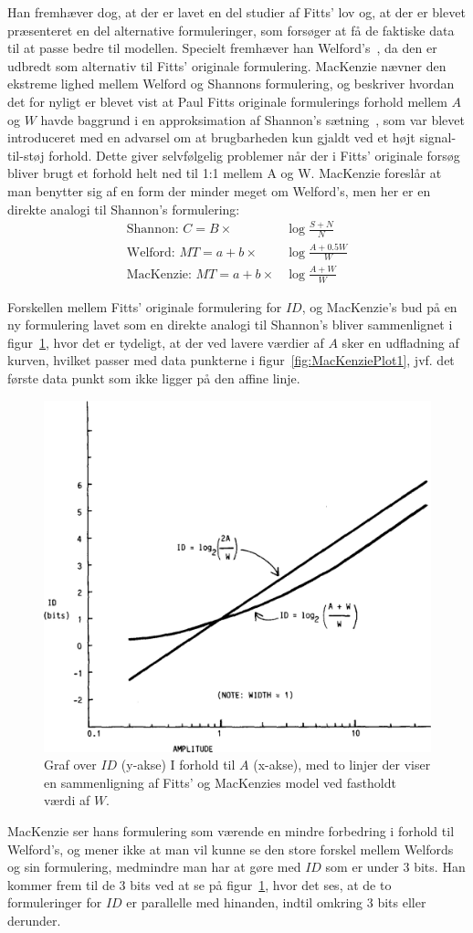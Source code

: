 Han fremhæver dog, at der er lavet en del studier af Fitts' lov og, at der er blevet præsenteret en del alternative formuleringer, som forsøger at få de faktiske data til at passe bedre til modellen. Specielt fremhæver han Welford's~\cite{welford1960,welford1968}, da den er udbredt som alternativ til Fitts' originale formulering. MacKenzie nævner den ekstreme lighed mellem Welford og Shannons formulering, og beskriver hvordan det for nyligt er blevet vist at Paul Fitts originale formulerings forhold mellem $A$ og $W$ havde baggrund i en approksimation af Shannon's sætning~\cite[p. 388]{fitts1954}, som var blevet introduceret med en advarsel om at brugbarheden kun gjaldt ved et højt signal-til-støj forhold. Dette giver selvfølgelig problemer når der i Fitts' originale forsøg bliver brugt et forhold helt ned til 1:1 mellem A og W. MacKenzie foreslår at man benytter sig af en form der minder meget om Welford's, men her er en direkte analogi til Shannon's formulering:
\begin{align}
\text{Shannon: }C=B\times&\log{\frac{S+N}{N}}\\
\text{Welford: }MT=a+b\times&\log{\frac{A+0.5W}{W}}\\
\text{MacKenzie: }MT=a+b\times&\log{\frac{A+W}{W}}
\end{align}

Forskellen mellem Fitts' originale formulering for $ID$, og MacKenzie's bud på en ny formulering lavet som en direkte analogi til Shannon's bliver sammenlignet i figur~\ref{fig:MacKenziePlot2}, hvor det er tydeligt, at der ved lavere værdier af $A$ sker en udfladning af kurven, hvilket passer med data punkterne i figur~\ref{fig:MacKenziePlot1}, jvf. det første data punkt som ikke ligger på den affine linje.\\
\begin{figure}[h]
\centering
\includegraphics[width=.5\linewidth]{images/illustrations/mackenzie_plot_2}
\caption{Graf over $ID$ (y-akse) I forhold til $A$ (x-akse), med to linjer der viser en sammenligning af Fitts' og MacKenzies model ved fastholdt værdi af $W$.}
\label{fig:MacKenziePlot2}
\end{figure}
MacKenzie ser hans formulering som værende en mindre forbedring i forhold til Welford's, og mener ikke at man vil kunne se den store forskel mellem Welfords og sin formulering, medmindre man har at gøre med $ID$ som er under 3 bits. Han kommer frem til de 3 bits ved at se på figur~\ref{fig:MacKenziePlot2}, hvor det ses, at de to formuleringer for $ID$ er parallelle med hinanden, indtil omkring 3 bits eller derunder.\\

